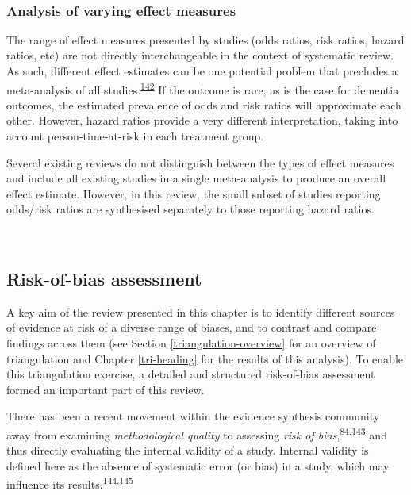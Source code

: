 \documentclass[a4paper, twoside]{templates/ociamthesis}
\begin{document}
~

\hypertarget{analysis-of-varying-effect-measures}{%
\subsubsection{Analysis of varying effect measures}\label{analysis-of-varying-effect-measures}}

The range of effect measures presented by studies (odds ratios, risk ratios, hazard ratios, etc) are not directly interchangeable in the context of systematic review. As such, different effect estimates can be one potential problem that precludes a meta-analysis of all studies.\textsuperscript{\protect\hyperlink{ref-mckenzie2019}{142}} If the outcome is rare, as is the case for dementia outcomes, the estimated prevalence of odds and risk ratios will approximate each other. However, hazard ratios provide a very different interpretation, taking into account person-time-at-risk in each treatment group.

Several existing reviews do not distinguish between the types of effect measures and include all existing studies in a single meta-analysis to produce an overall effect estimate. However, in this review, the small subset of studies reporting odds/risk ratios are synthesised separately to those reporting hazard ratios.

~

\hypertarget{risk-of-bias}{%
\subsection{Risk-of-bias assessment}\label{risk-of-bias}}

A key aim of the review presented in this chapter is to identify different sources of evidence at risk of a diverse range of biases, and to contrast and compare findings across them (see Section \ref{triangulation-overview} for an overview of triangulation and Chapter \ref{tri-heading} for the results of this analysis). To enable this triangulation exercise, a detailed and structured risk-of-bias assessment formed an important part of this review.

There has been a recent movement within the evidence synthesis community away from examining \emph{methodological quality} to assessing \emph{risk of bias},\textsuperscript{\protect\hyperlink{ref-mcguinness2018}{84},\protect\hyperlink{ref-sterne2016}{143}} and thus directly evaluating the internal validity of a study. Internal validity is defined here as the absence of systematic error (or bias) in a study, which may influence its results.\textsuperscript{\protect\hyperlink{ref-campbell1957}{144},\protect\hyperlink{ref-juni2001}{145}}
\end{document}
